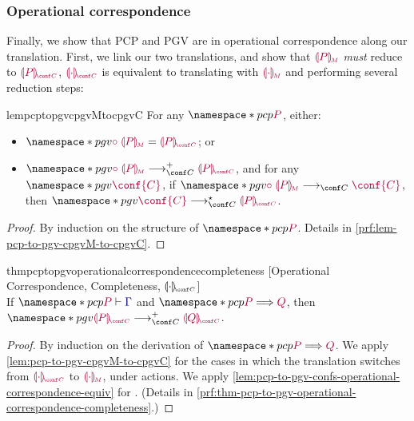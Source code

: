 \documentclass[main.tex]{subfiles}
\begin{document}
\subsubsection*{Operational correspondence}
Finally, we show that PCP and PGV are in operational correspondence along our translation. First, we link our two translations, and show that $\tm{\cpgvM{P}}$ \emph{must} reduce to $\tm{\cpgvC{P}}$, \ie $\tm{\cpgvC{\cdot}}$ is equivalent to translating with $\tm{\cpgvM{\cdot}}$ and performing several reduction steps:
\begin{restatablelemma}{lempcptopgvcpgvMtocpgvC}
  \label{lem:pcp-to-pgv-cpgvM-to-cpgvC}
  For any $\pcp{\tm{P}}$, either:
  \begin{itemize}
  \item $\pgv{\tm{\child\;\cpgvM{P}}=\tm{\cpgvC{P}}}$; or
  \item   $\pgv{\tm{\child\;\cpgvM{P}}\cred^+\tm{\cpgvC{P}}}$, and for any $\pgv{\tm{\conf{C}}}$, if $\pgv{\tm{\child\;\cpgvM{P}}\cred\tm{\conf{C}}}$, then $\pgv{\tm{\conf{C}}\cred^\star\tm{\cpgvC{P}}}$.
  \end{itemize}
\end{restatablelemma}
\begin{proof}
  By induction on the structure of $\pcp{\tm{P}}$.
  Details in \cref{prf:lem-pcp-to-pgv-cpgvM-to-cpgvC}.
\end{proof}

\begin{restatabletheorem}{thmpcptopgvoperationalcorrespondencecompleteness}%
  [Operational Correspondence, Completeness, $\cpgvC{\cdot}$]
  \label{thm:pcp-to-pgv-operational-correspondence-completeness}
  \hfill\\%
  If $\pcp{\seq{P}{\ty{\Gamma}}}$ and $\pcp{\tm{P}\red\tm{Q}}$,
  then $\pgv{\tm{\cpgvC{P}}\cred^+\tm{\cpgvC{Q}}}$.
\end{restatabletheorem}
\begin{proof}
  By induction on the derivation of $\pcp{\tm{P}\red\tm{Q}}$.
  We apply \cref{lem:pcp-to-pgv-cpgvM-to-cpgvC} for the cases in which
  the translation switches from $\tm{\cpgvC{\cdot}}$ to $\tm{\cpgvM{\cdot}}$,
  \ie under actions.
  We apply \cref{lem:pcp-to-pgv-confs-operational-correspondence-equiv} for
  . 
  (Details in \cref{prf:thm-pcp-to-pgv-operational-correspondence-completeness}.)
\end{proof}
\end{document}
